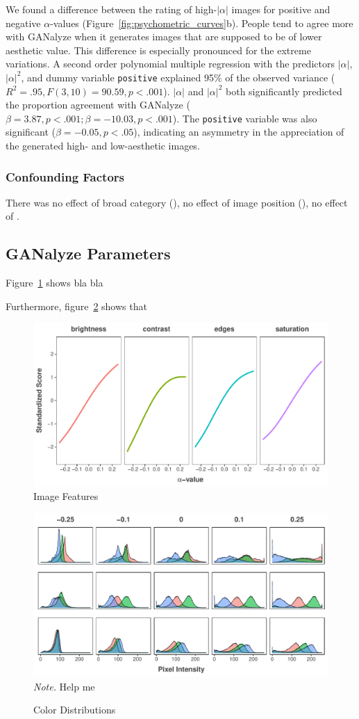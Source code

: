 \documentclass[../main.tex]{subfiles}
\begin{document}
	We found a difference between the rating of high-$|\alpha|$ images for positive and negative $\alpha$-values (Figure~\ref{fig:psychometric_curves}b). People tend to agree more with GANalyze when it generates images that are supposed to be of lower aesthetic value. This difference is especially pronounced for the extreme variations. A second order polynomial multiple regression with the predictors $|\alpha|$, $|\alpha|^2$, and dummy variable \texttt{positive} explained 95\% of the observed variance ($R^2=.95, F(3,10)=90.59, p<.001$). $|\alpha|$ and $|\alpha|^2$ both significantly predicted the proportion agreement with GANalyze ($\beta=3.87, p<.001; \beta=-10.03, p<.001$). The \texttt{positive} variable was also significant ($\beta=-0.05, p<.05$), indicating an asymmetry in the appreciation of the generated high- and low-aesthetic images.  


	\subsubsection{Confounding Factors}
	There was no effect of broad category (), no effect of image position (), no effect of  .
	
	\subsection{GANalyze Parameters}
	Figure~\ref{fig:img_features} shows bla bla \lipsum[2]
	
	Furthermore, figure~\ref{fig:col_distributions} shows that \lipsum[3]
	
	\begin{figure}[!tb]
		\caption{Image Features}
		\label{fig:img_features}
		\includegraphics[width=1\linewidth]{images/results/img_features.pdf}
	\end{figure}

	\begin{figure}[!tb]
		\caption{Color Distributions}
		\label{fig:col_distributions}
		\includegraphics[width=1\linewidth]{images/results/col_dists.pdf}
		\textit{Note.} Help me
	\end{figure}
\end{document}
